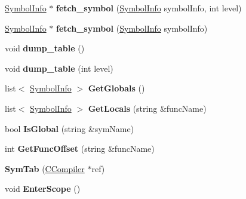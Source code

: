 \begin{DoxyCompactItemize}
\item 
\hypertarget{classSymTab_ac0bfd9c56cfd8e697046178629adbebc}{\hyperlink{structSymbolInfo}{Symbol\-Info} $\ast$ {\bfseries fetch\-\_\-symbol} (\hyperlink{structSymbolInfo}{Symbol\-Info} symbol\-Info, int level)}\label{classSymTab_ac0bfd9c56cfd8e697046178629adbebc}

\item 
\hypertarget{classSymTab_aa977139826a1cdf093078e0527ed1ab3}{\hyperlink{structSymbolInfo}{Symbol\-Info} $\ast$ {\bfseries fetch\-\_\-symbol} (\hyperlink{structSymbolInfo}{Symbol\-Info} symbol\-Info)}\label{classSymTab_aa977139826a1cdf093078e0527ed1ab3}

\item 
\hypertarget{classSymTab_ab4c005eb114053be22fdbe315542f55b}{void {\bfseries dump\-\_\-table} ()}\label{classSymTab_ab4c005eb114053be22fdbe315542f55b}

\item 
\hypertarget{classSymTab_ad5d45136f341bf024a226fe600fb4dcc}{void {\bfseries dump\-\_\-table} (int level)}\label{classSymTab_ad5d45136f341bf024a226fe600fb4dcc}

\item 
\hypertarget{classSymTab_aced837e720830dd9ccb2d3dde621d489}{list$<$ \hyperlink{structSymbolInfo}{Symbol\-Info} $>$ {\bfseries Get\-Globals} ()}\label{classSymTab_aced837e720830dd9ccb2d3dde621d489}

\item 
\hypertarget{classSymTab_a76b5a70170535019b1fe58fa25a9998c}{list$<$ \hyperlink{structSymbolInfo}{Symbol\-Info} $>$ {\bfseries Get\-Locals} (string \&func\-Name)}\label{classSymTab_a76b5a70170535019b1fe58fa25a9998c}

\item 
\hypertarget{classSymTab_a4c4699d90ffd605b205e9e94be9eacde}{bool {\bfseries Is\-Global} (string \&sym\-Name)}\label{classSymTab_a4c4699d90ffd605b205e9e94be9eacde}

\item 
\hypertarget{classSymTab_a793c31d247f484b04a9283e71f172756}{int {\bfseries Get\-Func\-Offset} (string \&func\-Name)}\label{classSymTab_a793c31d247f484b04a9283e71f172756}

\item 
\hypertarget{classSymTab_a20c7b65c7ffb728fa792e87258d381a2}{{\bfseries Sym\-Tab} (\hyperlink{classCCompiler}{C\-Compiler} $\ast$ref)}\label{classSymTab_a20c7b65c7ffb728fa792e87258d381a2}

\item 
\hypertarget{classSymTab_af335dd1ba840dfab4219856545d5d8ef}{void {\bfseries Enter\-Scope} ()}\label{classSymTab_af335dd1ba840dfab4219856545d5d8ef}


\end{DoxyCompactItemize}

